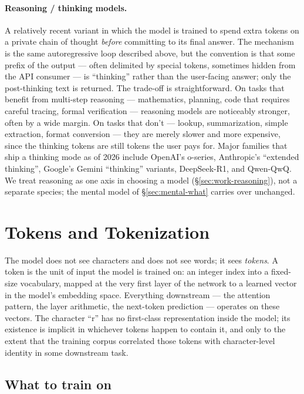 \paragraph{Reasoning / thinking models.}
A relatively recent variant in which the model is trained to
spend extra tokens on a private chain of thought \emph{before}
committing to its final answer. The mechanism is the same
autoregressive loop described above, but the convention is that
some prefix of the output --- often delimited by special tokens,
sometimes hidden from the API consumer --- is ``thinking'' rather
than the user-facing answer; only the post-thinking text is
returned. The trade-off is straightforward. On tasks that benefit
from multi-step reasoning --- mathematics, planning, code that
requires careful tracing, formal verification --- reasoning
models are noticeably stronger, often by a wide margin. On tasks
that don't --- lookup, summarization, simple extraction, format
conversion --- they are merely slower and more expensive, since
the thinking tokens are still tokens the user pays for. Major
families that ship a thinking mode as of 2026 include OpenAI's
o-series, Anthropic's ``extended thinking'', Google's Gemini
``thinking'' variants, DeepSeek-R1, and Qwen-QwQ. We treat
reasoning as one axis in choosing a model
(\S\ref{sec:work-reasoning}), not a separate species; the mental
model of \S\ref{sec:mental-what} carries over unchanged.

\section{Tokens and Tokenization}
\label{sec:mental-tokens}

The model does not see characters and does not see words; it sees
\emph{tokens}. A token is the unit of input the model is trained
on: an integer index into a fixed-size vocabulary, mapped at the
very first layer of the network to a learned vector in the
model's embedding space. Everything downstream --- the attention
pattern, the layer arithmetic, the next-token prediction ---
operates on these vectors. The character ``r'' has no first-class
representation inside the model; its existence is implicit in
whichever tokens happen to contain it, and only to the extent
that the training corpus correlated those tokens with
character-level identity in some downstream task.

\subsection{What to train on}
\label{sec:mental-tokens-what}

